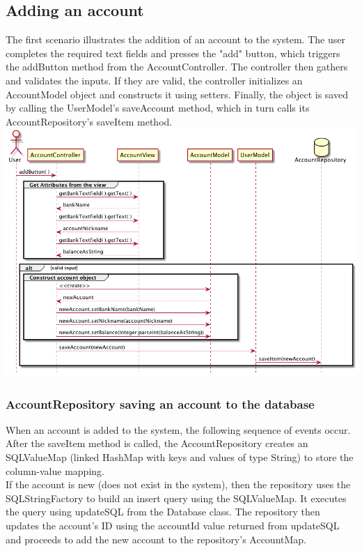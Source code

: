 \documentclass[12pt]{article}
\begin{document}
\subsection{Adding an account}
The first scenario illustrates the addition of an account to the system. The user completes the required text fields and presses the "add" button, which triggers the addButton method from the AccountController. The controller then gathers and validates the inputs. If they are valid, the controller initializes an AccountModel object and constructs it using setters. Finally, the object is saved by calling the UserModel's saveAccount method, which in turn calls its AccountRepository's saveItem method.
\includegraphics[width=\textwidth,height=\textheight,keepaspectratio]{diagrams/sequence/addAccount.png}

\newpage
\subsubsection{AccountRepository saving an account to the database}
When an account is added to the system, the following sequence of events occur. After the saveItem method is called, the AccountRepository creates an SQLValueMap (linked HashMap with keys and values of type String) to store the column-value mapping. \\

If the account is new (does not exist in the system), then the repository uses the SQLStringFactory to build an insert query using the SQLValueMap. It executes the query using updateSQL from the Database class. The repository then updates the account's ID using the accountId value returned from updateSQL and proceeds to add the new account to the repository's AccountMap.\\
\end{document}
